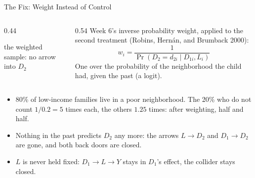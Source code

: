 \documentclass[aspectratio=169,11pt,xcolor=dvipsnames]{beamer}
\newcommand{\srcp}[1]{{\scriptsize\color{gray}(#1)}}
\begin{document}
\begin{frame}{The Fix: Weight Instead of Control}
\begin{columns}[c]
\begin{column}{0.44\linewidth}
\begin{center}

{\footnotesize the weighted sample: no arrow into $D_2$}
\end{center}
\end{column}
\begin{column}{0.54\linewidth}
Week 6's inverse probability weight, applied to the second treatment
\srcp{Robins, Hern\'an, and Brumback 2000}:
\[ w_i = \frac{1}{\Pr(D_2 = d_{2i} \mid D_{1i}, L_i)} \]
One over the probability of the neighborhood the child had, given the past (a logit).
\end{column}
\end{columns}
\vskip4pt
\begin{itemize}\itemsep3pt
  \item 80\% of low-income families live in a poor neighborhood. The 20\% who do not count
        $1 / 0.2 = 5$ times each, the others $1.25$ times: after weighting, half and half.
  \item Nothing in the past predicts $D_2$ any more: the arrows $L \to D_2$ and $D_1 \to D_2$
        are gone, and both back doors are closed.
  \item $L$ is never held fixed: $D_1 \to L \to Y$ stays in $D_1$'s effect, the collider stays closed.
\end{itemize}
\end{frame}
\end{document}
